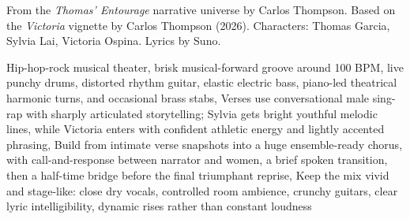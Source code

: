 
\begin{notes}
From the \emph{Thomas’ Entourage} narrative universe by Carlos Thompson. Based on the \emph{Victoria} vignette by Carlos Thompson (2026). Characters: Thomas Garcia, Sylvia Lai, Victoria Ospina. Lyrics by Suno.
\end{notes}
\begin{style}
Hip-hop-rock musical theater, brisk  musical-forward groove around 100 BPM, live punchy drums, distorted rhythm guitar, elastic electric bass, piano-led theatrical harmonic turns, and occasional brass stabs, Verses use conversational male sing-rap with sharply articulated storytelling; Sylvia gets bright youthful melodic lines, while Victoria enters with confident athletic energy and lightly accented phrasing, Build from intimate verse snapshots into a huge ensemble-ready chorus, with call-and-response between narrator and women, a brief spoken transition, then a half-time bridge before the final triumphant reprise, Keep the mix vivid and stage-like: close dry vocals, controlled room ambience, crunchy guitars, clear lyric intelligibility, dynamic rises rather than constant loudness
\end{style}
